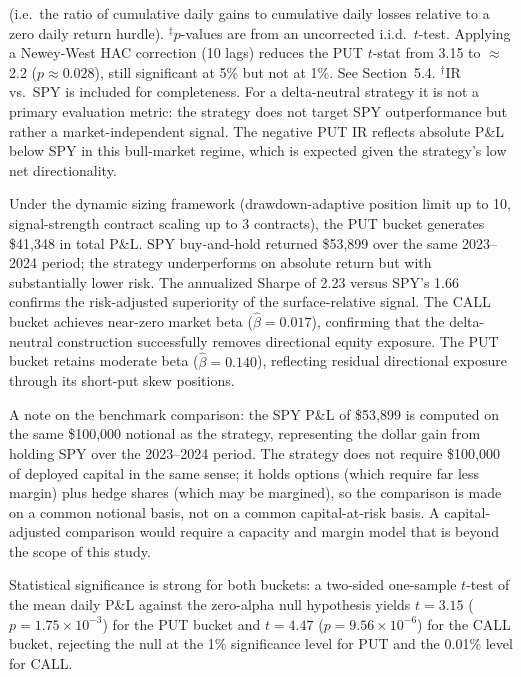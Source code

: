 \documentclass[10pt,twocolumn]{article}
\begin{document}
\begin{table}[tb]
{(i.e.\ the ratio of cumulative daily gains to cumulative daily losses
relative to a zero daily return hurdle). \quad
$^\ddagger$$p$-values are from an uncorrected i.i.d.\
$t$-test. Applying a Newey-West HAC correction (10 lags) reduces the PUT
$t$-stat from 3.15 to $\approx$2.2 ($p \approx 0.028$), still significant
at 5\% but not at 1\%. See Section~5.4. \quad
$^\dagger$IR vs.\ SPY is included for completeness.
For a delta-neutral strategy it is not a primary evaluation metric: the
strategy does not target SPY outperformance but rather a market-independent
signal. The negative PUT IR reflects absolute P\&L below SPY in this
bull-market regime, which is expected given the strategy's low net
directionality.}
\end{table}

Under the dynamic sizing framework (drawdown-adaptive position limit up to
10, signal-strength contract scaling up to 3 contracts), the PUT bucket
generates \$41,348 in total P\&L. SPY buy-and-hold returned \$53,899 over
the same 2023--2024 period; the strategy underperforms on absolute return but
with substantially lower risk. The annualized Sharpe of 2.23 versus SPY's
1.66 confirms the risk-adjusted superiority of the surface-relative signal.
The CALL bucket achieves near-zero market beta ($\hat{\beta} = 0.017$),
confirming that the delta-neutral construction successfully removes
directional equity exposure. The PUT bucket retains moderate beta
($\hat{\beta} = 0.140$), reflecting residual directional exposure through its
short-put skew positions.

A note on the benchmark comparison: the SPY P\&L of \$53,899 is computed
on the same \$100,000 notional as the strategy, representing the dollar gain
from holding SPY over the 2023--2024 period.  The strategy does not
require \$100,000 of deployed capital in the same sense; it holds options
(which require far less margin) plus hedge shares (which may be margined),
so the comparison is made on a common notional basis, not on a common
capital-at-risk basis.  A capital-adjusted comparison would require a
capacity and margin model that is beyond the scope of this study.

Statistical significance is strong for both buckets: a two-sided one-sample
$t$-test of the mean daily P\&L against the zero-alpha null hypothesis yields
$t = 3.15$ ($p = 1.75 \times 10^{-3}$) for the PUT bucket and $t = 4.47$
($p = 9.56 \times 10^{-6}$) for the CALL bucket, rejecting the null at the
1\% significance level for PUT and the 0.01\% level for CALL.
\end{document}

